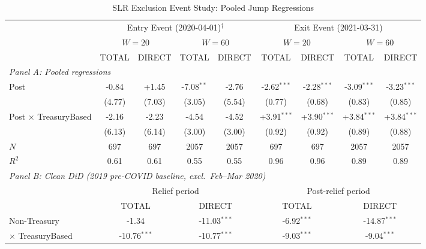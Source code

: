 \begin{table}[htbp]
\centering
\caption{SLR Exclusion Event Study: Pooled Jump Regressions}
\label{tab:slr_pooled_v2}
\small
\begin{tabular}{l cccc cccc}
\hline\hline
& \multicolumn{4}{c}{Entry Event (2020-04-01)$^\dagger$}
& \multicolumn{4}{c}{Exit Event (2021-03-31)} \\
\cmidrule(lr){2-5} \cmidrule(lr){6-9}
& \multicolumn{2}{c}{$W=20$} & \multicolumn{2}{c}{$W=60$}
& \multicolumn{2}{c}{$W=20$} & \multicolumn{2}{c}{$W=60$} \\
\cmidrule(lr){2-3} \cmidrule(lr){4-5} \cmidrule(lr){6-7} \cmidrule(lr){8-9}
& TOTAL & DIRECT & TOTAL & DIRECT & TOTAL & DIRECT & TOTAL & DIRECT \\
\hline
\multicolumn{9}{l}{\textit{Panel A: Pooled regressions}} \\[3pt]
\quad Post & -0.84 & +1.45 & -7.08$^{**}$ & -2.76 & -2.62$^{***}$ & -2.28$^{***}$ & -3.09$^{***}$ & -3.23$^{***}$ \\
 & (4.77) & (7.03) & (3.05) & (5.54) & (0.77) & (0.68) & (0.83) & (0.85) \\[3pt]
\quad Post $\times$ TreasuryBased & -2.16 & -2.23 & -4.54 & -4.52 & +3.91$^{***}$ & +3.90$^{***}$ & +3.84$^{***}$ & +3.84$^{***}$ \\
 & (6.13) & (6.14) & (3.00) & (3.00) & (0.92) & (0.92) & (0.89) & (0.88) \\[3pt]
$N$ & 697 & 697 & 2057 & 2057 & 697 & 697 & 2057 & 2057 \\
$R^2$ & 0.61 & 0.61 & 0.55 & 0.55 & 0.96 & 0.96 & 0.89 & 0.89 \\
\hline
\multicolumn{9}{l}{\textit{Panel B: Clean DiD (2019 pre-COVID baseline, excl.\ Feb--Mar 2020)}} \\[3pt]
& \multicolumn{4}{c}{Relief period} & \multicolumn{4}{c}{Post-relief period} \\
\cmidrule(lr){2-5} \cmidrule(lr){6-9}
& \multicolumn{2}{c}{TOTAL} & \multicolumn{2}{c}{DIRECT}
& \multicolumn{2}{c}{TOTAL} & \multicolumn{2}{c}{DIRECT} \\
\cmidrule(lr){2-3} \cmidrule(lr){4-5} \cmidrule(lr){6-7} \cmidrule(lr){8-9}
\quad Non-Treasury & \multicolumn{2}{c}{-1.34} & \multicolumn{2}{c}{-11.03$^{***}$} & \multicolumn{2}{c}{-6.92$^{***}$} & \multicolumn{2}{c}{-14.87$^{***}$} \\
\quad $\times$ TreasuryBased & \multicolumn{2}{c}{-10.76$^{***}$} & \multicolumn{2}{c}{-10.77$^{***}$} & \multicolumn{2}{c}{-9.03$^{***}$} & \multicolumn{2}{c}{-9.04$^{***}$} \\

\end{tabular}
\end{table}
